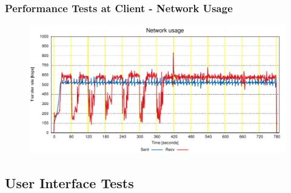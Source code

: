\documentclass[compress]{beamer}
\begin{document}
	\begin{frame}[c]
		\frametitle{Performance Tests at Client - Network Usage}
		\begin{figure}[H]
			\includegraphics[width=\textwidth]{figures/net_clt.pdf}
		\end{figure}
	\end{frame}

\subsection{User Interface Tests}
\end{document}

